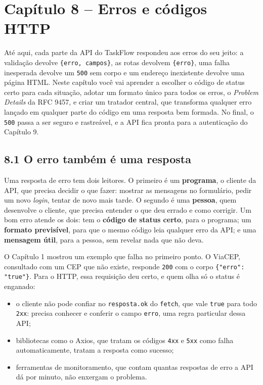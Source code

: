 \section{Capítulo 8 -- Erros e códigos HTTP}

Até aqui, cada parte da API do TaskFlow respondeu aos erros do seu jeito: a validação devolve \texttt{\{erro, campos\}}, as rotas devolvem \texttt{\{erro\}}, uma falha inesperada devolve um \texttt{500} sem corpo e um endereço inexistente devolve uma página HTML. Neste capítulo você vai aprender a escolher o código de status certo para cada situação, adotar um formato único para todos os erros, o \textit{Problem Details} da RFC 9457, e criar um tratador central, que transforma qualquer erro lançado em qualquer parte do código em uma resposta bem formada. No final, o \texttt{500} passa a ser seguro e rastreável, e a API fica pronta para a autenticação do Capítulo 9.

\subsection{8.1 O erro também é uma resposta}

Uma resposta de erro tem dois leitores. O primeiro é um \textbf{programa}, o cliente da API, que precisa decidir o que fazer: mostrar as mensagens no formulário, pedir um novo \textit{login}, tentar de novo mais tarde. O segundo é uma \textbf{pessoa}, quem desenvolve o cliente, que precisa entender o que deu errado e como corrigir. Um bom erro atende os dois: tem o \textbf{código de status certo}, para o programa; um \textbf{formato previsível}, para que o mesmo código leia qualquer erro da API; e uma \textbf{mensagem útil}, para a pessoa, sem revelar nada que não deva.

O Capítulo 1 mostrou um exemplo que falha no primeiro ponto. O ViaCEP, consultado com um CEP que não existe, responde \texttt{200} com o corpo \texttt{\{"erro": "true"\}}. Para o HTTP, essa requisição deu certo, e quem olha só o status é enganado:

\begin{itemize}
  \item o cliente não pode confiar no \texttt{resposta.ok} do \texttt{fetch}, que vale \texttt{true} para todo \texttt{2xx}: precisa conhecer e conferir o campo \texttt{erro}, uma regra particular dessa API;
  \item bibliotecas como o Axios, que tratam os códigos \texttt{4xx} e \texttt{5xx} como falha automaticamente, tratam a resposta como sucesso;
  \item ferramentas de monitoramento, que contam quantas respostas de erro a API dá por minuto, não enxergam o problema.
\end{itemize}

